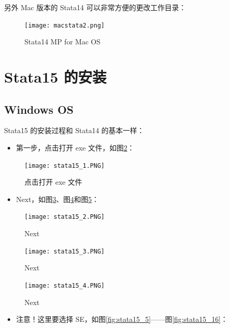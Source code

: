 \documentclass[cn,fancy,blue,11pt]{elegantbook}
\begin{document}
另外 Mac 版本的 Stata14 可以非常方便的更改工作目录：

\begin{figure}[htbp]
  \centering
  \texttt{[image: macstata2.png]}
  \caption{Stata14 MP for Mac OS}
  \label{fig:macstata2}
\end{figure}

\hypertarget{stata15-}{%
\section{Stata15 的安装}\label{stata15-}}

\hypertarget{windows-os-1}{%
\subsection{Windows OS}\label{windows-os-1}}

Stata15 的安装过程和 Stata14 的基本一样：
\begin{itemize}
  \item 第一步，点击打开 exe 文件，如图\ref{fig:stata15_1}：
\end{itemize}

\begin{figure}[htbp]
  \centering
  \texttt{[image: stata15\_1.PNG]}
  \caption{点击打开 exe 文件}
  \label{fig:stata15_1}
\end{figure}

\begin{itemize}
  \item Next，如图\ref{fig:stata15_2}、图\ref{fig:stata15_3}和图\ref{fig:stata15_4}：
\end{itemize}

\begin{figure}[htbp]
  \centering
  \texttt{[image: stata15\_2.PNG]}
  \caption{Next}
  \label{fig:stata15_2}
\end{figure}

\begin{figure}[htbp]
  \centering
  \texttt{[image: stata15\_3.PNG]}
  \caption{Next}
  \label{fig:stata15_3}
\end{figure}

\begin{figure}[htbp]
  \centering
  \texttt{[image: stata15\_4.PNG]}
  \caption{Next}
  \label{fig:stata15_4}
\end{figure}

\begin{itemize}
  \item 注意！这里要选择 SE，如图\ref{fig:stata15_5}——图\ref{fig:stata15_16}：
\end{itemize}
\end{document}
